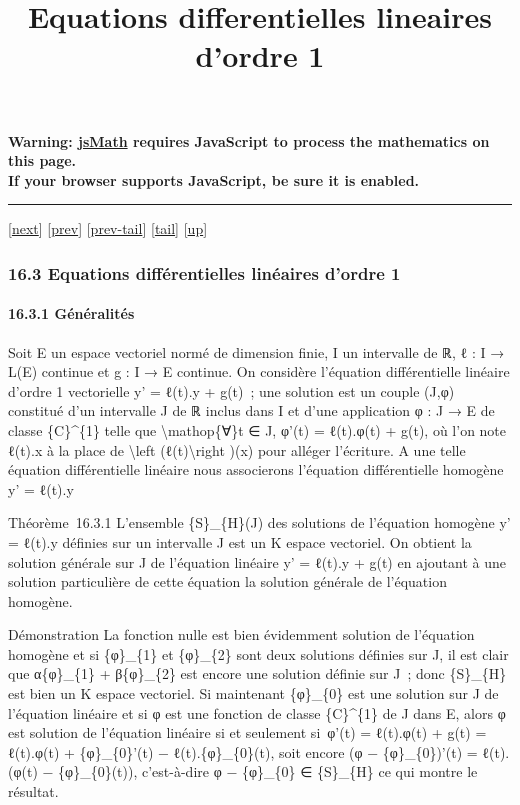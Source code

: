 \documentclass[]{article}
\title{Equations differentielles lineaires d'ordre 1}
\author{}
\date{}
\begin{document}
\maketitle

\textbf{Warning: \href{http://www.math.union.edu/locate/jsMath}{jsMath}
requires JavaScript to process the mathematics on this page.\\ If your
browser supports JavaScript, be sure it is enabled.}

\begin{center}\rule{3in}{0.4pt}\end{center}

{[}\href{coursse89.html}{next}{]} {[}\href{coursse87.html}{prev}{]}
{[}\href{coursse87.html\#tailcoursse87.html}{prev-tail}{]}
{[}\hyperref[tailcoursse88.html]{tail}{]}
{[}\href{coursch17.html\#coursse88.html}{up}{]}

\subsubsection{16.3 Equations différentielles linéaires d'ordre 1}

\paragraph{16.3.1 Généralités}

Soit E un espace vectoriel normé de dimension finie, I un intervalle de
ℝ, ℓ : I → L(E) continue et g : I → E continue. On considère l'équation
différentielle linéaire d'ordre 1 vectorielle y' = ℓ(t).y + g(t)~; une
solution est un couple (J,φ) constitué d'un intervalle J de ℝ inclus
dans I et d'une application φ : J → E de classe \{C\}\^{}\{1\} telle que
\textbackslash{}mathop\{∀\}t ∈ J, φ'(t) = ℓ(t).φ(t) + g(t), où l'on note
ℓ(t).x à la place de \textbackslash{}left (ℓ(t)\textbackslash{}right
)(x) pour alléger l'écriture. A une telle équation différentielle
linéaire nous associerons l'équation différentielle homogène y' = ℓ(t).y

Théorème~16.3.1 L'ensemble \{S\}\_\{H\}(J) des solutions de l'équation
homogène y' = ℓ(t).y définies sur un intervalle J est un K espace
vectoriel. On obtient la solution générale sur J de l'équation linéaire
y' = ℓ(t).y + g(t) en ajoutant à une solution particulière de cette
équation la solution générale de l'équation homogène.

Démonstration La fonction nulle est bien évidemment solution de
l'équation homogène et si \{φ\}\_\{1\} et \{φ\}\_\{2\} sont deux
solutions définies sur J, il est clair que α\{φ\}\_\{1\} + β\{φ\}\_\{2\}
est encore une solution définie sur J~; donc \{S\}\_\{H\} est bien un K
espace vectoriel. Si maintenant \{φ\}\_\{0\} est une solution sur J de
l'équation linéaire et si φ est une fonction de classe \{C\}\^{}\{1\} de
J dans E, alors φ est solution de l'équation linéaire si et seulement
si~φ'(t) = ℓ(t).φ(t) + g(t) = ℓ(t).φ(t) + \{φ\}\_\{0\}'(t) −
ℓ(t).\{φ\}\_\{0\}(t), soit encore (φ − \{φ\}\_\{0\})'(t) = ℓ(t).(φ(t) −
\{φ\}\_\{0\}(t)), c'est-à-dire φ − \{φ\}\_\{0\} ∈ \{S\}\_\{H\} ce qui
montre le résultat.
\end{document}
